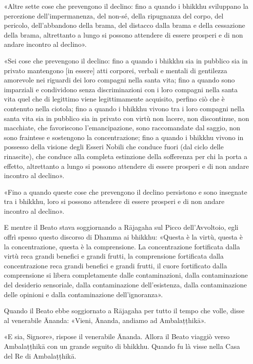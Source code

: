 «Altre sette cose che prevengono il declino: fino a quando i bhikkhu sviluppano
la percezione dell’impermanenza, del non-sé, della ripugnanza del corpo, del
pericolo, dell’abbandono della brama, del distacco dalla brama e della
cessazione della brama, altrettanto a lungo si possono attendere di essere
prosperi e di non andare incontro al declino».


«Sei cose che prevengono il declino: fino a quando i bhikkhu sia in pubblico sia
in privato mantengono [in essere] atti corporei, verbali e mentali di gentilezza
amorevole nei riguardi dei loro compagni nella santa vita; fino a quando sono
imparziali e condividono senza discriminazioni con i loro compagni nella santa
vita quel che di legittimo viene legittimamente acquisito, perfino ciò che è
contenuto nella ciotola; fino a quando i bhikkhu vivono tra i loro compagni
nella santa vita sia in pubblico sia in privato con virtù non lacere, non
discontinue, non macchiate, che favoriscono l’emancipazione, sono raccomandate
dal saggio, non sono fraintese e sostengono la concentrazione; fino a quando i
bhikkhu vivono in possesso della visione degli Esseri Nobili che conduce fuori
(dal ciclo delle rinascite), che conduce alla completa estinzione della
sofferenza per chi la porta a effetto, altrettanto a lungo si possono attendere
di essere prosperi e di non andare incontro al declino».

«Fino a quando queste cose che prevengono il declino persistono e sono insegnate
tra i bhikkhu, loro si possono attendere di essere prosperi e di non andare
incontro al declino».

E mentre il Beato stava soggiornando a Rājagaha sul Picco dell’Avvoltoio, egli
offrì spesso questo discorso di Dhamma ai bhikkhu: «Questa è la virtù, questa è
la concentrazione, questa è la comprensione. La concentrazione fortificata dalla
virtù reca grandi benefici e grandi frutti, la comprensione fortificata dalla
concentrazione reca grandi benefici e grandi frutti, il cuore fortificato dalla
comprensione si libera completamente dalle contaminazioni, dalla contaminazione
del desiderio sensoriale, dalla contaminazione dell’esistenza, dalla
contaminazione delle opinioni e dalla contaminazione dell’ignoranza».

Quando il Beato ebbe soggiornato a Rājagaha per tutto il tempo che volle, disse
al venerabile Ānanda: «Vieni, Ānanda, andiamo ad Ambalaṭṭhikā».

«E sia, Signore», rispose il venerabile Ānanda. Allora il Beato viaggiò verso
Ambalaṭṭhikā con un grande seguito di bhikkhu. Quando fu là visse nella Casa del
Re di Ambalaṭṭhikā.

